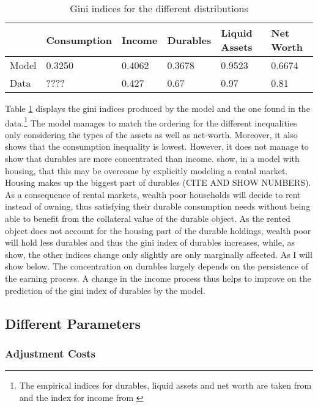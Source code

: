\documentclass[a4paper,12pt]{article}
\begin{document}
\begin{table}[]
\centering
\caption{Gini indices for the different distributions}
\label{Gini_Ranking}
\begin{tabular}{@{}llllll@{}}
\toprule
      & Consumption & Income & Durables & Liquid Assets & Net Worth \\ \midrule
Model & 0.3250      & 0.4062 & 0.3678   & 0.9523        & 0.6674    \\ \midrule
Data  & ????        & 0.427  & 0.67     & 0.97          & 0.81      \\ \bottomrule
\end{tabular}
\end{table}

Table \ref{Gini_Ranking} displays the gini indices produced by the model and the one found in the data.\footnote{The empirical indices for durables, liquid assets and net worth are taken from \cite{hintermaier2010} and the index for income from \cite{hintermaier2011}} The model manages to match the ordering for the different inequalities only considering the types of the assets as well as net-worth. Moreover, it also shows that the consumption inequality is lowest. However, it does not manage to show that durables are more concentrated than income. \cite{diaz2010} show, in a model with housing, that this may be overcome by explicitly modeling a rental market. Housing makes up the biggest part of durables (CITE AND SHOW NUMBERS). As a consequence of rental markets, wealth poor households will decide to rent instead of owning, thus satisfying their durable consumption needs without being able to benefit from the collateral value of the durable object. As the rented object does not account for the housing part of the durable holdings, wealth poor will hold less durables and thus the gini index of durables increases, while, as \cite{diaz2010} show, the other indices change only slightly are only marginally affected. 
As I will show below. The concentration on durables largely depends on the persistence of the earning process. A change in the income process thus helps to improve on the prediction of the gini index of durables by the model. 

\subsection{Different Parameters}
\subsubsection{Adjustment Costs}
\end{document}

